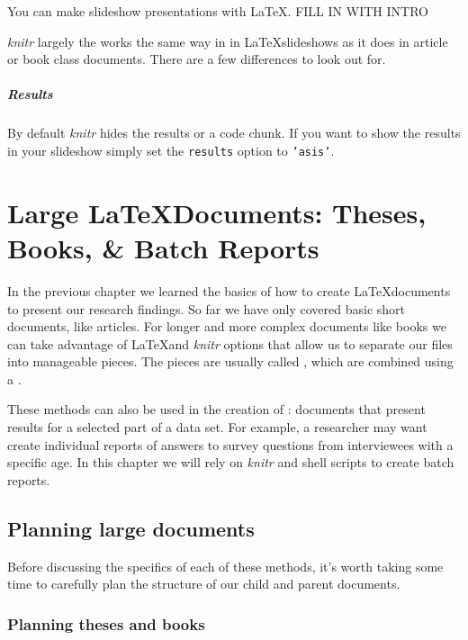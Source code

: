\documentclass[ChapterTOCs,krantz1]{krantz}\usepackage{graphicx, color}
\begin{document}
You can make slideshow presentations with \LaTeX. FILL IN WITH INTRO

{\emph{knitr}} largely the works the same way in in \LaTeX slideshows as it does in article or book class documents. There are a few differences to look out for. 

\paragraph{Results}

By default {\emph{knitr}} hides the results or a code chunk. If you want to show the results in your slideshow simply set the {\tt{results}} option to {\tt{'asis'}}.




\chapter{Large \LaTeX Documents: Theses, Books, \& Batch Reports}\label{LargeDocs}

In the previous chapter we learned the basics of how to create \LaTeX documents to present our research findings. So far we have only covered basic short documents, like articles. For longer and more complex documents like books we can take advantage of \LaTeX and {\emph{knitr}} options that allow us to separate our files into manageable pieces. The pieces are usually called , which are combined using a .

These methods can also be used in the creation of : documents that present results for a selected part of a data set. For example, a researcher may want create individual reports of answers to survey questions from interviewees with a specific age. In this chapter we will rely on {\emph{knitr}} and shell scripts to create batch reports. 

\section{Planning large documents}

Before discussing the specifics of each of these methods, it's worth taking some time to carefully plan the structure of our child and parent documents.

\subsection{Planning theses and books}
\end{document}

